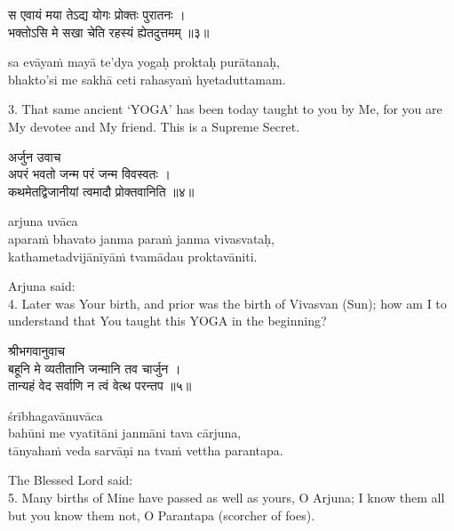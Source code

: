 \begin{gitaverse}
स एवायं मया तेऽद्य योगः प्रोक्तः पुरातनः । \\
भक्तोऽसि मे सखा चेति रहस्यं ह्येतदुत्तमम् ॥३॥
\end{gitaverse}

\begin{transliteration}
sa evāyaṁ mayā te'dya yogaḥ proktaḥ purātanaḥ, \\
bhakto'si me sakhā ceti rahasyaṁ hyetaduttamam.
\end{transliteration}

3. That same ancient `YOGA' has been today taught to you by Me, for you are My
devotee and My friend. This is a Supreme Secret.

\begin{gitaverse}
अर्जुन उवाच \\
अपरं भवतो जन्म परं जन्म विवस्वतः । \\
कथमेतद्विजानीयां त्वमादौ प्रोक्तवानिति ॥४॥
\end{gitaverse}

\begin{transliteration}
arjuna uvāca \\
aparaṁ bhavato janma paraṁ janma vivasvataḥ, \\
kathametadvijānīyāṁ tvamādau proktavāniti.
\end{transliteration}

Arjuna said: \\
4. Later was Your birth, and prior was the birth of Vivasvan (Sun); how am I to
understand that You taught this YOGA in the beginning?

\begin{gitaverse}
श्रीभगवानुवाच \\
बहूनि मे व्यतीतानि जन्मानि तव चार्जुन । \\
तान्यहं वेद सर्वाणि न त्वं वेत्थ परन्तप ॥५॥
\end{gitaverse}

\begin{transliteration}
śrībhagavānuvāca \\
bahūni me vyatītāni janmāni tava cārjuna, \\
tānyahaṁ veda sarvāṇi na tvaṁ vettha parantapa.
\end{transliteration}

The Blessed Lord said: \\
5. Many births of Mine have passed as well as yours, O Arjuna; I know them all
but you know them not, O Parantapa (scorcher of foes).

